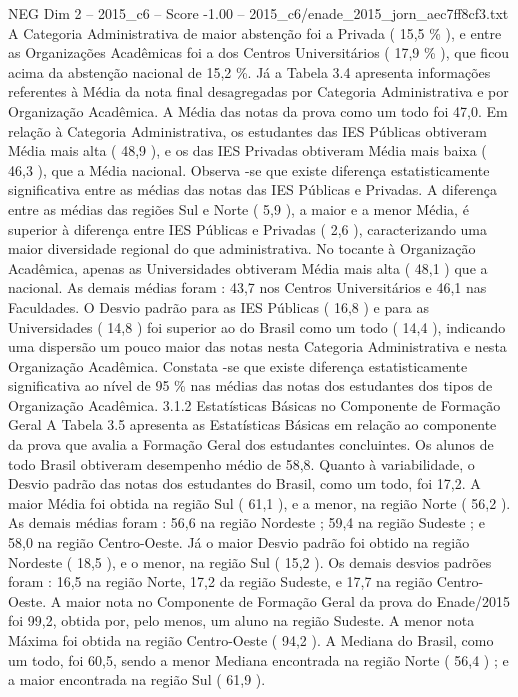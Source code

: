 \begin{textsample}{NEG Dim 2 – 2015\_c6 – Score -1.00 – 2015\_c6/enade\_2015\_jorn\_aec7ff8cf3.txt}
A Categoria Administrativa de maior abstenção foi a Privada ( 15,5 \% ), e entre as Organizações Acadêmicas foi a dos Centros Universitários ( 17,9 \% ), que ficou acima da abstenção nacional de 15,2 \%.
Já a Tabela 3.4 apresenta informações referentes à Média da nota final desagregadas por Categoria Administrativa e por Organização Acadêmica.
A Média das notas da prova como um todo foi 47,0.
Em relação à Categoria Administrativa, os estudantes das IES Públicas obtiveram Média mais alta ( 48,9 ), e os das IES Privadas obtiveram Média mais baixa ( 46,3 ), que a Média nacional.
Observa -se que existe diferença estatisticamente significativa entre as médias das notas das IES Públicas e Privadas.
A diferença entre as médias das regiões Sul e Norte ( 5,9 ), a maior e a menor Média, é superior à diferença entre IES Públicas e Privadas ( 2,6 ), caracterizando uma maior diversidade regional do que administrativa.
No tocante à Organização Acadêmica, apenas as Universidades obtiveram Média mais alta ( 48,1 ) que a nacional.
As demais médias foram : 43,7 nos Centros Universitários e 46,1 nas Faculdades.
O Desvio padrão para as IES Públicas ( 16,8 ) e para as Universidades ( 14,8 ) foi superior ao do Brasil como um todo ( 14,4 ), indicando uma dispersão um pouco maior das notas nesta Categoria Administrativa e nesta Organização Acadêmica.
Constata -se que existe diferença estatisticamente significativa ao nível de 95 \% nas médias das notas dos estudantes dos tipos de Organização Acadêmica. 3.1.2 Estatísticas Básicas no Componente de Formação Geral A Tabela 3.5 apresenta as Estatísticas Básicas em relação ao componente da prova que avalia a Formação Geral dos estudantes concluintes.
Os alunos de todo Brasil obtiveram desempenho médio de 58,8.
Quanto à variabilidade, o Desvio padrão das notas dos estudantes do Brasil, como um todo, foi 17,2.
A maior Média foi obtida na região Sul ( 61,1 ), e a menor, na região Norte ( 56,2 ).
As demais médias foram : 56,6 na região Nordeste ; 59,4 na região Sudeste ; e 58,0 na região Centro-Oeste.
Já o maior Desvio padrão foi obtido na região Nordeste ( 18,5 ), e o menor, na região Sul ( 15,2 ).
Os demais desvios padrões foram : 16,5 na região Norte, 17,2 da região Sudeste, e 17,7 na região Centro-Oeste.
A maior nota no Componente de Formação Geral da prova do Enade/2015 foi 99,2, obtida por, pelo menos, um aluno na região Sudeste.
A menor nota Máxima foi obtida na região Centro-Oeste ( 94,2 ).
A Mediana do Brasil, como um todo, foi 60,5, sendo a menor Mediana encontrada na região Norte ( 56,4 ) ; e a maior encontrada na região Sul ( 61,9 ).

\end{textsample}
